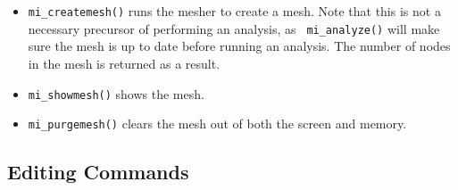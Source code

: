 \begin{itemize}
\item{\tt mi\_createmesh()} runs the mesher to create a mesh. Note that this is not a
necessary precursor of performing an analysis, as {\tt
mi\_analyze()} will make sure the mesh is up to date before running
an analysis. The number of nodes in the mesh is returned as a result.

\item{\tt mi\_showmesh()} shows the mesh.

\item{\tt mi\_purgemesh()} clears the mesh out of both the screen and
memory.
\end{itemize}

\subsection{Editing Commands}

